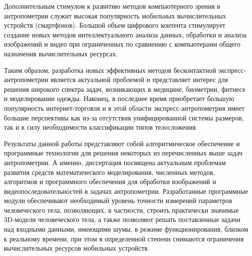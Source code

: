 Дополнительным стимулом к развитию методов компьютерного зрения в антропометрии служит высокая популярность мобильных вычислительных устройств (смартфонов). Большой объем цифрового контента стимулирует создание новых методов интеллектуального анализа данных, обработки и анализа изображений и видео при ограниченных по сравнению с компьютерами общего назначения вычислительных ресурсах.

Таким образом, разработка новых эффективных методов бесконтактной экспресс-антропометрии является актуальной проблемой и представляет интерес для решения широкого спектра задач, возникающих в медицине, биометрии, фитнесе и моделировании одежды. Наконец, в последнее время приобретает большую популярность интернет-торговля и в этой области экспресс-антропометрия имеет большие перспективы как из-за отсутствия унифицированной системы размеров, так и в силу необходимости классификации типов телосложения.

Результаты данной работы представляют собой алгоритмическое обеспечение и программные технологии для решения некоторых из перечисленных выше задач антропометрии. А именно, диссертация посвящена актуальным проблемам развития средств математического моделирования, численных методов, алгоритмов и программного обеспечения для обработки изображений и видеопоследовательностей в задачах антропометрии. Разработанные программные модули обеспечивают необходимый уровень точности измерений параметров человеческого тела, позволяющих, в частности, строить практически значимые 3D-модели человеческого тела, а также позволяют решать поставленные задачи над входными данными, имеющими шумы, в режиме функционирования, близком к реальному времени, при этом в определенной степени снимаются ограничения вычислительных ресурсов мобильных устройств.

